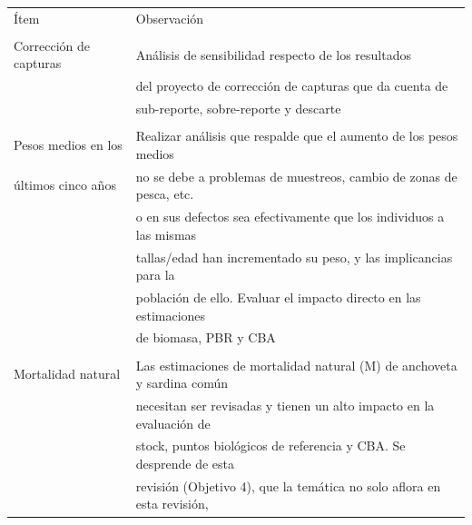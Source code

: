 \documentclass[
  spanish,
]{article}
\begin{document}
\begin{table}[h]
  \centering
  \resizebox{15cm}{!} {
  \begin{tabular}{|l|l|}
  \hline
  Ítem                    & Observación                                                                \\ 
                          &                                                                            \\ \hline    
  Corrección de capturas  & Análisis de sensibilidad respecto de los resultados                        \\
                          & del proyecto de corrección de capturas que da cuenta de                    \\
                          & sub-reporte, sobre-reporte y descarte                                      \\ \hline
                          &                                                                            \\
   Pesos medios en los    & Realizar análisis que respalde que el aumento de los pesos medios          \\
  últimos cinco años      & no se debe a problemas de muestreos, cambio de zonas de pesca, etc.        \\
                          & o en sus defectos sea efectivamente que los individuos a las mismas        \\
                          & tallas/edad han incrementado su peso, y las implicancias para la           \\
                          & población de ello. Evaluar el impacto directo en las estimaciones          \\
                          & de biomasa, PBR y CBA                                                      \\ \hline
                          &                                                                            \\
   Mortalidad natural     & Las estimaciones de mortalidad natural (M) de anchoveta y sardina común    \\
                          & necesitan ser revisadas y tienen un alto impacto en la evaluación de       \\
                          & stock, puntos biológicos de referencia y CBA. Se desprende de esta          \\
                          & revisión (Objetivo 4), que la temática no solo aflora en esta revisión,    \\

\end{tabular}}
\end{table}
\end{document}
